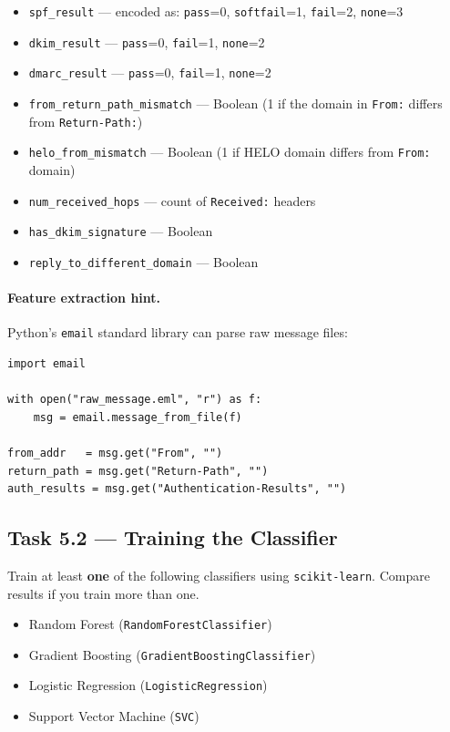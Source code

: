 \documentclass[11pt]{article}
\begin{document}
\begin{itemize}[noitemsep]
  \item \texttt{spf\_result} --- encoded as: \texttt{pass}=0,
    \texttt{softfail}=1, \texttt{fail}=2, \texttt{none}=3
  \item \texttt{dkim\_result} --- \texttt{pass}=0, \texttt{fail}=1,
    \texttt{none}=2
  \item \texttt{dmarc\_result} --- \texttt{pass}=0, \texttt{fail}=1,
    \texttt{none}=2
  \item \texttt{from\_return\_path\_mismatch} --- Boolean (1 if the
    domain in \texttt{From:} differs from \texttt{Return-Path:})
  \item \texttt{helo\_from\_mismatch} --- Boolean (1 if HELO domain
    differs from \texttt{From:} domain)
  \item \texttt{num\_received\_hops} --- count of \texttt{Received:}
    headers
  \item \texttt{has\_dkim\_signature} --- Boolean
  \item \texttt{reply\_to\_different\_domain} --- Boolean
\end{itemize}

\paragraph{Feature extraction hint.}
Python's \texttt{email} standard library can parse raw message files:

\begin{listing}[H]
\begin{verbatim}
import email

with open("raw_message.eml", "r") as f:
    msg = email.message_from_file(f)

from_addr   = msg.get("From", "")
return_path = msg.get("Return-Path", "")
auth_results = msg.get("Authentication-Results", "")
\end{verbatim}
\end{listing}

\subsection{Task 5.2 --- Training the Classifier}

Train at least \textbf{one} of the following classifiers using
\texttt{scikit-learn}. Compare results if you train more than one.

\begin{itemize}[noitemsep]
  \item Random Forest (\texttt{RandomForestClassifier})
  \item Gradient Boosting (\texttt{GradientBoostingClassifier})
  \item Logistic Regression (\texttt{LogisticRegression})
  \item Support Vector Machine (\texttt{SVC})
\end{itemize}
\end{document}
